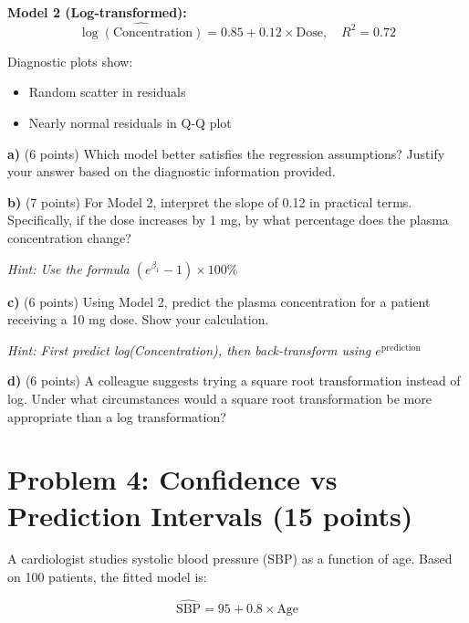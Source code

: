 \documentclass[11pt]{article}
\begin{document}
\textbf{Model 2 (Log-transformed):}
$$\widehat{\log(\text{Concentration})} = 0.85 + 0.12 \times \text{Dose}, \quad R^2 = 0.72$$

Diagnostic plots show:
\begin{itemize}
\item Random scatter in residuals
\item Nearly normal residuals in Q-Q plot
\end{itemize}

\vspace{0.5cm}

\textbf{a)} (6 points) Which model better satisfies the regression assumptions? Justify your answer based on the diagnostic information provided.

\vspace{3cm}

\textbf{b)} (7 points) For Model 2, interpret the slope of 0.12 in practical terms. Specifically, if the dose increases by 1 mg, by what percentage does the plasma concentration change?

\textit{Hint: Use the formula $(e^{\beta_1} - 1) \times 100\%$}

\vspace{3cm}

\textbf{c)} (6 points) Using Model 2, predict the plasma concentration for a patient receiving a 10 mg dose. Show your calculation.

\textit{Hint: First predict log(Concentration), then back-transform using $e^{\text{prediction}}$}

\vspace{3cm}

\textbf{d)} (6 points) A colleague suggests trying a square root transformation instead of log. Under what circumstances would a square root transformation be more appropriate than a log transformation?

\vspace{3cm}

\newpage

\section*{Problem 4: Confidence vs Prediction Intervals (15 points)}

A cardiologist studies systolic blood pressure (SBP) as a function of age. Based on 100 patients, the fitted model is:

$$\widehat{\text{SBP}} = 95 + 0.8 \times \text{Age}$$
\end{document}
